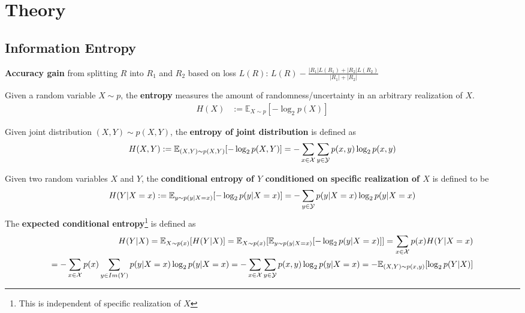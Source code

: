 \documentclass[4pt]{article}
\begin{document}
	\section{Theory}
	\subsection{Information Entropy}
	\begin{definition}
		\textbf{Accuracy gain} from splitting $R$ into $R_1$ and $R_2$ based on loss $L(R)$:
		$
			L(R) - \frac{|R_1|L(R_1) + |R_2|L(R_2)}{|R_1| + |R_2|}
		$
	\end{definition}
	\begin{definition}
		Given a random variable $X \sim p$, the \textbf{entropy} measures the amount of randomness/uncertainty in an arbitrary realization of $X$. 
		\begin{align}
			H(X) &:= \mathbb{E}_{X \sim p}[- \log_2 p(X)]
		\end{align}
	\end{definition}
	\begin{definition}
		Given joint distribution $(X, Y) \sim p(X, Y)$, the \textbf{entropy of joint distribution} is defined as
		\begin{align}
			H(X, Y) := \mathbb{E}_{(X, Y) \sim p(X, Y)} [
			- \log_2 p(X, Y)
			] = - \sum_{x \in \mathcal{{X}}} \sum_{y \in \mathcal{{Y}}} p(x, y) \log_2 p(x, y)
		\end{align}
	\end{definition}
		\begin{definition}
		Given two random variables $X$ and $Y$, the \textbf{conditional entropy of $Y$ conditioned on specific realization of $X$} is defined to be 
		\begin{align}
			H(Y|X=x) := \mathbb{E}_{y \sim p(y|X=x)}[
				-\log_2 p(y|X=x)
			]
			= - \sum_{y \in \mathcal{{Y}}} p(y|X=x) \log_2 p(y|X=x)
		\end{align}
		The \textbf{expected conditional entropy}\footnote{This is independent of specific realization of $X$} is defined as 
		\begin{align}
			H(Y|X) = \mathbb{E}_{X \sim p(x)} [H(Y|X)]
			= \mathbb{E}_{X \sim p(x)} [\mathbb{E}_{y \sim p(y|X=x)}[
				-\log_2 p(y|X=x)]
			]
			= \sum_{x \in \mathcal{{X}}} p(x) H(Y|X=x) \\
			= - \sum_{x \in \mathcal{{X}}} p(x) \sum_{y \in Im(Y)} p(y|X=x) \log_2 p(y|X=x)
			= - \sum_{x \in \mathcal{{X}}} \sum_{y \in \mathcal{{Y}}} p(x, y) \log_2 p(y | X = x)
			= - \mathbb{E}_{(X, Y) \sim p(x, y)} [\log_2 p(Y|X)]
		\end{align}
	\end{definition}
\end{document}
